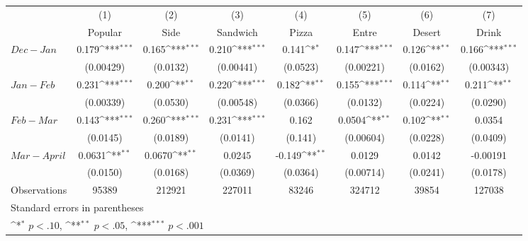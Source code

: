 {
\def\sym#1{\ifmmode^{#1}\else\(^{#1}\)\fi}
\begin{tabular}{l*{7}{c}}
\hline\hline
                    &\multicolumn{1}{c}{(1)}&\multicolumn{1}{c}{(2)}&\multicolumn{1}{c}{(3)}&\multicolumn{1}{c}{(4)}&\multicolumn{1}{c}{(5)}&\multicolumn{1}{c}{(6)}&\multicolumn{1}{c}{(7)}\\
                    &\multicolumn{1}{c}{Popular}&\multicolumn{1}{c}{Side}&\multicolumn{1}{c}{Sandwich}&\multicolumn{1}{c}{Pizza}&\multicolumn{1}{c}{Entre}&\multicolumn{1}{c}{Desert}&\multicolumn{1}{c}{Drink}\\
\hline
$ Dec-Jan $         &       0.179\sym{***}&       0.165\sym{***}&       0.210\sym{***}&       0.141\sym{*}  &       0.147\sym{***}&       0.126\sym{**} &       0.166\sym{***}\\
                    &   (0.00429)         &    (0.0132)         &   (0.00441)         &    (0.0523)         &   (0.00221)         &    (0.0162)         &   (0.00343)         \\
[1em]
 $ Jan-Feb $        &       0.231\sym{***}&       0.200\sym{**} &       0.220\sym{***}&       0.182\sym{**} &       0.155\sym{***}&       0.114\sym{**} &       0.211\sym{**} \\
                    &   (0.00339)         &    (0.0530)         &   (0.00548)         &    (0.0366)         &    (0.0132)         &    (0.0224)         &    (0.0290)         \\
[1em]
 $ Feb-Mar $        &       0.143\sym{***}&       0.260\sym{***}&       0.231\sym{***}&       0.162         &      0.0504\sym{**} &       0.102\sym{**} &      0.0354         \\
                    &    (0.0145)         &    (0.0189)         &    (0.0141)         &     (0.141)         &   (0.00604)         &    (0.0228)         &    (0.0409)         \\
[1em]
 $ Mar-April $      &      0.0631\sym{**} &      0.0670\sym{**} &      0.0245         &      -0.149\sym{**} &      0.0129         &      0.0142         &    -0.00191         \\
                    &    (0.0150)         &    (0.0168)         &    (0.0369)         &    (0.0364)         &   (0.00714)         &    (0.0241)         &    (0.0178)         \\
\hline
Observations        &       95389         &      212921         &      227011         &       83246         &      324712         &       39854         &      127038         \\
\hline\hline
\multicolumn{8}{l}{\footnotesize Standard errors in parentheses}\\
\multicolumn{8}{l}{\footnotesize \sym{*} \(p<.10\), \sym{**} \(p<.05\), \sym{***} \(p<.001\)}\\
\end{tabular}
}
